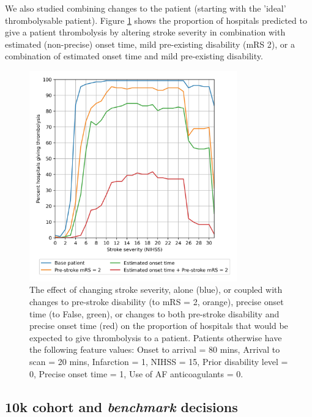 We also studied combining changes to the patient (starting with the 'ideal' thrombolysable patient). Figure \ref{fig:artificial_2} shows the proportion of hospitals predicted to give a patient thrombolysis by altering stroke severity in combination with estimated (non-precise) onset time, mild pre-existing disability (mRS 2), or a combination of estimated onset time and mild pre-existing disability.

\begin{figure}
\centering
\includegraphics[width=0.8\textwidth]{./images/20_synthetic_xgb_10_features_interactions}
\caption{The effect of changing stroke severity, alone (blue), or coupled with changes to pre-stroke disability (to mRS = 2, orange), precise onset time (to False, green), or changes to both pre-stroke disability and precise onset time (red) on the proportion of hospitals that would be expected to give thrombolysis to a patient. Patients otherwise have the following feature values: Onset to arrival = 80 mins, Arrival to scan = 20 mins, Infarction = 1, NIHSS = 15, Prior disability level = 0, Precise onset time = 1, Use of AF anticoagulants = 0.}
\label{fig:artificial_2}
\end{figure}




\subsection{10k cohort and \emph{benchmark} decisions}


